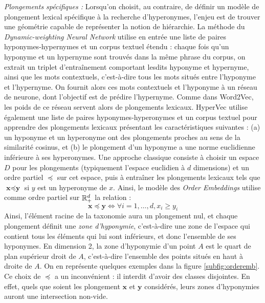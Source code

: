 \textit{Plongements spécifiques :}
Lorsqu'on choisit, au contraire, de définir un modèle de plongement lexical spécifique à la recherche d'hyperonymes, l'enjeu est de trouver une géométrie capable de représenter la notion de hiérarchie. La méthode du \textit{Dynamic-weighting Neural Network} \cite{luu-etal-2016-learning} utilise en entrée une liste de paires hyponymes-hypernymes et un corpus textuel étendu : chaque fois qu'un hyponyme et un hypernyme sont trouvés dans la même phrase du corpus, on extrait un triplet d'entraînement comportant lesdits hyponyme et hypernyme, ainsi que les mots contextuels, c'est-à-dire tous les mots situés entre l'hyponyme et l'hypernyme. On fournit alors ces mots contextuels et l'hyponyme à un réseau de neurone, dont l'objectif est de prédire l'hypernyme. Comme dans Word2Vec, les poids de ce réseau servent alors de plongements lexicaux. HyperVec \cite{nguyen-etal-2017-hierarchical} utilise également une liste de paires hyponymes-hyperonymes et un corpus textuel pour apprendre des plongements lexicaux présentant les caractéristiques suivantes : (a) un hyponyme et un hyperonyme ont des plongements proches au sens de la similarité cosinus, et (b) le plongement d'un hyponyme a une norme euclidienne inférieure à ses hyperonymes.
Une approche classique consiste à choisir un espace $D$ pour les plongements (typiquement l'espace euclidien à $d$ dimensions) et un ordre partiel $\preceq$ sur cet espace, puis à entraîner les plongements lexicaux tels que $\textbf{x} \preceq \textbf{y}$ si $y$ est un hyperonyme de $x$. Ainsi, le modèle des \textit{Order Embeddings}\cite{vendrov2015order} utilise comme ordre partiel sur $\mathbb{R}^d_+$ la relation :
\begin{equation}
    \textbf{x} \preceq \textbf{y} \iff \forall i = 1, \ldots, d, {} x_i \geq y_i
\end{equation}
Ainsi, l'élément racine de la taxonomie aura un plongement nul, et chaque plongement définit une
\textit{zone d'hyponymie}, c'est-à-dire une zone de l'espace qui contient tous les éléments qui lui sont inférieurs, et donc l'ensemble de ses hyponymes. En dimension 2, la zone d'hyponymie d'un point $A$ est le quart de plan supérieur droit de $A$, c'est-à-dire l'ensemble des points situés en haut à droite de $A$. On en représente quelques exemples dans la figure \ref{subfig:orderemb}. Ce choix de $\preceq$ a un inconvénient : il interdit d'avoir des classes disjointes. En effet, quels que soient les plongement $\textbf{x}$ et $\textbf{y}$ considérés, leurs zones d'hyponymies auront une intersection non-vide.

